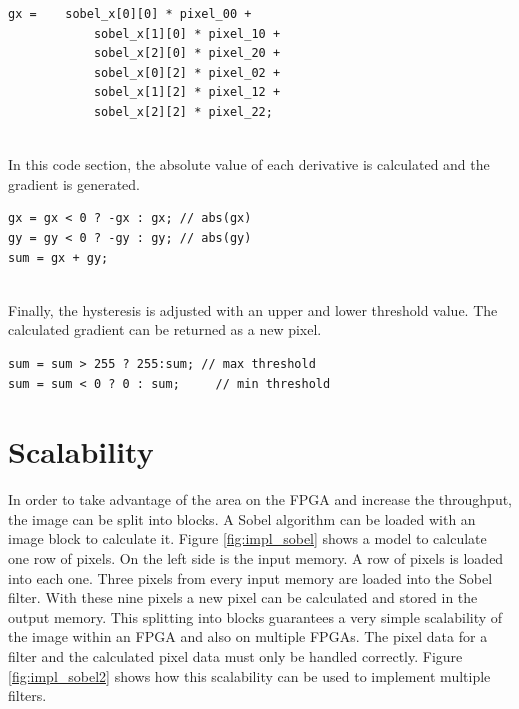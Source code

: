 \begin{minipage}{\textwidth}
\begin{lstlisting}[style=CStyle , caption=Calculation of derivative, label=lst:derivative]
gx = 	sobel_x[0][0] * pixel_00 +
			sobel_x[1][0] * pixel_10 +
			sobel_x[2][0] * pixel_20 +
			sobel_x[0][2] * pixel_02 +
			sobel_x[1][2] * pixel_12 +
			sobel_x[2][2] * pixel_22;
\end{lstlisting}
\end{minipage}
\\

In this code section, the absolute value of each derivative is calculated and the gradient is generated.

\begin{minipage}{\textwidth}
\begin{lstlisting}[style=CStyle , caption=Evaluate the absolute value and the gradient, label=lst:gradient]
gx = gx < 0 ? -gx : gx; // abs(gx)
gy = gy < 0 ? -gy : gy; // abs(gy)
sum = gx + gy;
\end{lstlisting}
\end{minipage}
\\

Finally, the hysteresis is adjusted with an upper and lower threshold value. The calculated gradient can be returned as a new pixel.

\begin{minipage}{\textwidth}
\begin{lstlisting}[style=CStyle , caption=Threshold, label=lst:threshold]
sum = sum > 255 ? 255:sum; // max threshold
sum = sum < 0 ? 0 : sum; 	 // min threshold
\end{lstlisting}
\end{minipage}

\clearpage
\section{Scalability}
In order to take advantage of the area on the FPGA and increase the throughput, the image can be split into blocks. A Sobel algorithm can be loaded with an image block to calculate it. Figure \ref{fig:impl_sobel} shows a model to calculate one row of pixels. On the left side is the input memory. A row of pixels is loaded into each one. Three pixels from every input memory are loaded into the Sobel filter. With these nine pixels a new pixel can be calculated and stored in the output memory.
This splitting into blocks guarantees a very simple scalability of the image within an FPGA and also on multiple FPGAs. The pixel data for a filter and the calculated pixel data must only be handled correctly. Figure \ref{fig:impl_sobel2} shows how this scalability can be used to implement multiple filters. 

